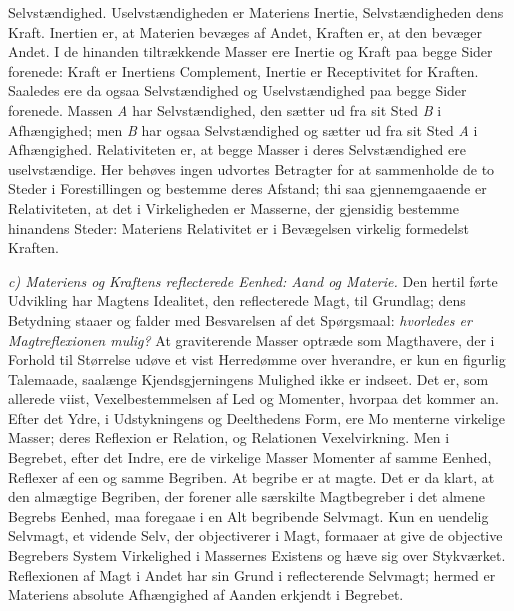 \documentclass[12pt,a4paper]{book}
\newcommand{\runin}[1]{\emph{#1}\hspace{0.4em}}
\begin{document}
Selvstændighed. Uselvstændigheden er Materiens Inertie,
Selvstændigheden dens Kraft. Inertien er, at Materien bevæges af
Andet, Kraften er, at den bevæger Andet. I de hinanden tiltrækkende
Masser ere Inertie og Kraft paa begge Sider forenede: Kraft er
Inertiens Complement, Inertie er Receptivitet for Kraften. Saaledes
ere da ogsaa Selvstændighed og Uselvstændighed paa begge Sider
forenede. Massen \textit{A} har Selvstændighed, den sætter ud fra sit
Sted \textit{B} i Afhængighed; men \textit{B} har ogsaa Selvstændighed
og sætter ud fra sit Sted \textit{A} i Afhængighed. Relativiteten er,
at begge Masser i deres Selvstændighed ere uselvstændige. Her behøves
ingen udvortes Betragter for at sammenholde de to Steder i
Forestillingen og bestemme deres Afstand; thi saa gjennemgaaende er
Relativiteten, at det i Virkeligheden er Masserne, der gjensidig
bestemme hinandens Steder: Materiens Relativitet er i Bevægelsen
virkelig formedelst Kraften.

\runin{c) Materiens og Kraftens reflecterede Eenhed: Aand og Materie.}
Den hertil førte Udvikling har Magtens Idealitet, den reflecterede
Magt, til Grundlag; dens Betydning staaer og falder med Besvarelsen af
det Spørgsmaal: \emph{hvorledes er Magtreflexionen mulig?} At
graviterende Masser optræde som Magthavere, der i Forhold til Størrelse
udøve et vist Herredømme over hverandre, er kun en figurlig Talemaade,
saalænge Kjendsgjerningens Mulighed ikke er indseet. Det er, som
allerede viist, Vexelbestemmelsen af Led og Momenter, hvorpaa det
kommer an. Efter det Ydre, i Udstykningens og Deelthedens Form, ere
Mo\-%
menterne virkelige Masser; deres Reflexion er Relation, og Relationen
Vexelvirkning. Men i Begrebet, efter det Indre, ere de virkelige Masser
Momenter af samme Eenhed, Reflexer af een og samme Begriben. At begribe
er at magte. Det er da klart, at den almægtige Begriben, der forener
alle særskilte Magtbegreber i det almene Begrebs Eenhed, maa foregaae i
en Alt begribende Selvmagt. Kun en uendelig Selvmagt, et vidende Selv,
der objectiverer i Magt, formaaer at give de objective Begrebers System
Virkelighed i Massernes Existens og hæve sig over Stykværket.
Reflexionen af Magt i Andet har sin Grund i reflecterende Selvmagt;
hermed er Materiens absolute Afhængighed af Aanden erkjendt i Begrebet.
\end{document}
